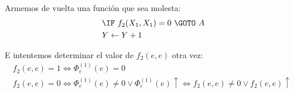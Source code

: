 \documentclass[fleqn, 11pt]{article}
\newcommand{\indef}{\uparrow}
\newcommand{\into}{\leftarrow}
\begin{document}
Armemos de vuelta una función que sea molesta:
\begin{align*}
	[A]\ &\IF\ f_2(X_1, X_1) = 0\ \GOTO\ A \\
	     &Y \into Y + 1
\end{align*}

E intentemos determinar el valor de $f_2(e, e)$ otra vez:
\begin{gather*}
	f_2(e, e) = 1 \iff \Phi^{(1)}_e(e) = 0 \\
	f_2(e, e) = 0
	\iff \Phi^{(1)}_e(e) \neq 0 \lor \Phi^{(1)}_e(e) \indef
	\iff f_2(e, e) \neq 0 \lor f_2(e, e) \indef
\end{gather*}
\end{document}
